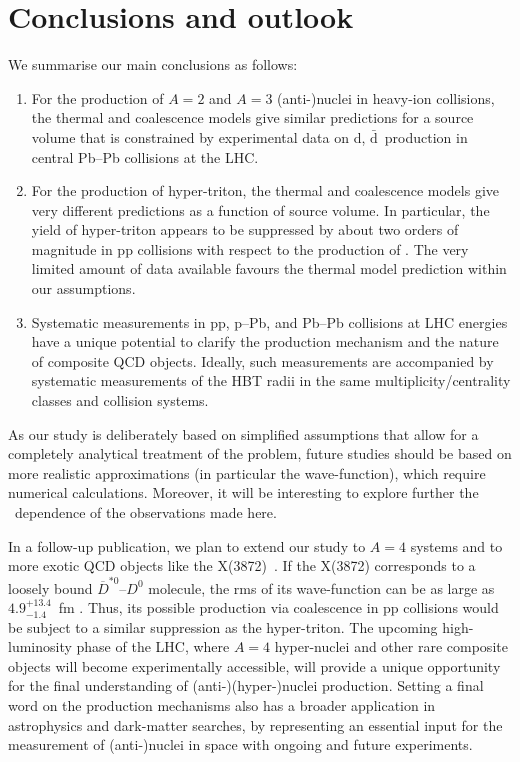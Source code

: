 \section{Conclusions and outlook}
We summarise our main conclusions as follows:
\begin{enumerate}
	\item For the production of $A=2$ and $A=3$ (anti-)nuclei in heavy-ion collisions, the thermal and coalescence models give similar predictions for a source volume that is constrained by experimental data on d, $\bar{\mathrm{d}}$~production in central Pb--Pb collisions at the LHC.
	\item For the production of hyper-triton, the thermal and coalescence models give very different predictions as a function of source volume. In particular, the yield of hyper-triton appears to be suppressed by about two orders of magnitude in pp collisions with respect to the production of \hethree. The very limited amount of data available favours the thermal model prediction within our assumptions.
	\item Systematic measurements in pp, p--Pb, and Pb--Pb collisions at LHC energies have a unique potential to clarify the production mechanism and the nature of composite QCD objects. Ideally, such measurements are accompanied by systematic measurements of the HBT radii in the same multiplicity/centrality classes and collision systems.
\end{enumerate}
As our study is deliberately based on simplified assumptions that allow for a completely analytical treatment of the problem, future studies should be based on more realistic approximations (in particular the wave-function), which require numerical calculations. Moreover, it will be interesting to explore further the \pt~dependence of the observations made here.

In a follow-up publication, we plan to extend our study to $A=4$ systems and to more exotic QCD objects like the X(3872)~\cite{Esposito:2015fsa, Cho:2017dcy}. 
If the X(3872) corresponds to a loosely bound $\overline{D}^{*0}$--$D^{0}$ molecule, the rms of its wave-function can be as large as $4.9^{+13.4}_{-1.4}$~fm \cite{Artoisenet:2010uu}. Thus, its possible production via coalescence in pp collisions would be subject to a similar suppression as the hyper-triton. 
The upcoming high-luminosity phase of the LHC, where $A = 4$ hyper-nuclei and other rare composite objects will become experimentally accessible, will provide a unique opportunity for the final understanding of \mbox{(anti-)}(hyper-)nuclei production.
Setting a final word on the production mechanisms also has a broader application in astrophysics and dark-matter searches, by representing an essential input for the measurement of (anti-)nuclei in space with ongoing \cite{Alcaraz:2000ss, Poulin:2018wzu} and future \cite{AMS100, Aramaki:2015laa} experiments. 

